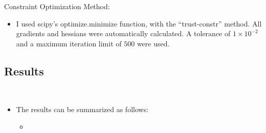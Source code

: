 \documentclass[a4paper]{article}
\begin{document}
Constraint Optimization Method:
\begin{itemize}
    \item I used scipy's optimize.minimize function, with the ``trust-constr''
        method. All gradients and hessians were automatically calculated. A
        tolerance of $1 \times 10^{-2}$ and a maximum iteration limit of
        $500$ were used.
\end{itemize}
\subsection*{Results}
\begin{centering}
    \scalebox{0.6}{} \\
\end{centering}
\begin{itemize}
    \item The results can be summarized as follows:
    \begin{itemize}
        \item 
    \end{itemize}
\end{itemize}
\end{document}
